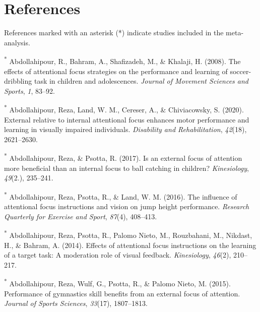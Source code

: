 \documentclass[
  man, donotrepeattitle,floatsintext]{apa7}
\newlength{\cslhangindent}
\newlength{\cslentryspacingunit} %
\newenvironment{CSLReferences}[2] %
 {%
  \setlength{\parindent}{0pt}
  \ifodd #1
  \let\oldpar\par
  \def\par{\hangindent=\cslhangindent\oldpar}
  \fi
  \setlength{\parskip}{#2\cslentryspacingunit}
 }%
 {}
\begin{document}
\newpage

\hypertarget{references}{%
\section{References}\label{references}}

References marked with an asterisk (*) indicate studies included in the meta-analysis.

\vspace{2ex}

\hypertarget{refs}{}
\begin{CSLReferences}{1}{0}
\leavevmode{}%
\textsuperscript{*} Abdollahipour, R., Bahram, A., Shafizadeh, M., \& Khalaji, H. (2008). The effects of attentional focus strategies on the performance and learning of soccer-dribbling task in children and adolescences. \emph{Journal of Movement Sciences and Sports}, \emph{1}, 83--92.

\leavevmode{}%
\textsuperscript{*} Abdollahipour, Reza, Land, W. M., Cereser, A., \& Chiviacowsky, S. (2020). External relative to internal attentional focus enhances motor performance and learning in visually impaired individuals. \emph{Disability and Rehabilitation}, \emph{42}(18), 2621--2630.

\leavevmode{}%
\textsuperscript{*} Abdollahipour, Reza, \& Psotta, R. (2017). Is an external focus of attention more beneficial than an internal focus to ball catching in children? \emph{Kinesiology}, \emph{49}(2.), 235--241.

\leavevmode{}%
\textsuperscript{*} Abdollahipour, Reza, Psotta, R., \& Land, W. M. (2016). The influence of attentional focus instructions and vision on jump height performance. \emph{Research Quarterly for Exercise and Sport}, \emph{87}(4), 408--413.

\leavevmode{}%
\textsuperscript{*} Abdollahipour, Reza, Psotta, R., Palomo Nieto, M., Rouzbahani, M., Nikdast, H., \& Bahram, A. (2014). Effects of attentional focus instructions on the learning of a target task: A moderation role of visual feedback. \emph{Kinesiology}, \emph{46}(2), 210--217.

\leavevmode{}%
\textsuperscript{*} Abdollahipour, Reza, Wulf, G., Psotta, R., \& Palomo Nieto, M. (2015). Performance of gymnastics skill benefits from an external focus of attention. \emph{Journal of Sports Sciences}, \emph{33}(17), 1807--1813.


\end{CSLReferences}
\end{document}
